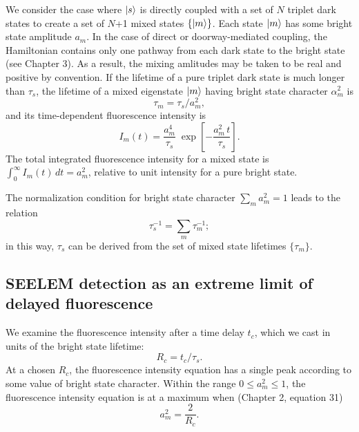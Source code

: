 \documentclass[12pt]{mitthesis}
\begin{document}
We consider the case where $\mathinner{|{s}\rangle}$ is directly coupled with a set of
$N$ triplet dark states to create a set of $N$+1 mixed states
$\lbrace\mathinner{|{m}\rangle}\rbrace$.  Each state $\mathinner{|{m}\rangle}$ has some bright state
amplitude $a_m$.  In the case of direct or doorway-mediated coupling,
the Hamiltonian contains only one pathway from each dark state to the
bright state (see Chapter 3).  As a result, the mixing amlitudes may
be taken to be real and positive by convention.  If the lifetime of a
pure triplet dark state is much longer than $\tau_s$, the lifetime of
a mixed eigenstate $\mathinner{|{m}\rangle}$ having bright state character
$\alpha_m^2$ is
\begin{equation}
  \label{eq:tau-m}
  \tau_m = \tau_s / a_m^2,
\end{equation}
and its time-dependent fluorescence intensity is
\begin{equation}
  \label{eq:int-m}
  I_m(t) = \frac{a_m^4}{\tau_s} \;
           \exp \left[
             -\frac{a_m^2 \, t}{\tau_s} 
           \right].
\end{equation}
The total integrated fluorescence intensity for a mixed state is
$\int_0^{\infty} I_m(t) \, dt = a_m^2$, relative to unit intensity for
a pure bright state.

The normalization condition for bright state character $\sum_m a_m^2 =
1$ leads to the relation
\begin{equation}
  \tau_s^{-1} = \sum_m \tau_m^{-1};
\end{equation}
in this way, $\tau_s$ can be derived from the set of mixed state
lifetimes $\lbrace \tau_m \rbrace$.

\subsection{SEELEM detection as an extreme limit of delayed fluorescence}

We examine the fluorescence intensity after a time delay $t_c$,
which we cast in units of the bright state lifetime:
\begin{equation}
  R_c = t_c / \tau_s.
\end{equation}
At a chosen $R_c$, the fluorescence intensity equation has a single
peak according to some value of bright state character.  Within the
range $0 \le a_m^2 \le 1$, the fluorescence intensity equation is at a
maximum when (Chapter 2, equation 31)
\begin{equation}
  \label{eq:am-max}
  a_m^2 = \frac{2}{R_c}.
\end{equation}
\end{document}
